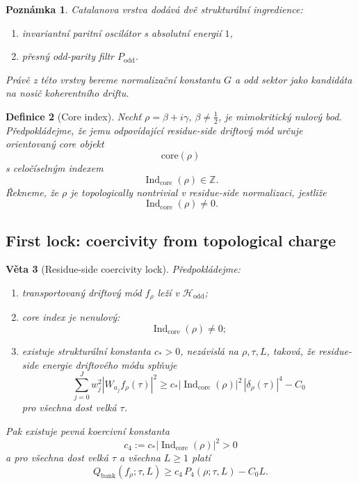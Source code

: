 \documentclass[11pt,a4paper]{article}
\newtheorem{theorem}{Věta}[section]
\newtheorem{definition}[theorem]{Definice}
\newtheorem{remark}[theorem]{Poznámka}
\begin{document}
\begin{remark}
Catalanova vrstva dodává dvě strukturální ingredience:
\begin{enumerate}[label=\textbf{(\arabic*)}]
    \item invariantní paritní oscilátor s absolutní energií \(1\),
    \item přesný odd-parity filtr \(P_{\mathrm{odd}}\).
\end{enumerate}
Právě z této vrstvy bereme normalizační konstantu \(G\) a odd sektor jako kandidáta
na nosič koherentního driftu.
\end{remark}

\begin{definition}[Core index]
Nechť \(\rho=\beta+i\gamma\), \(\beta\neq \frac12\), je mimokritický nulový bod.
Předpokládejme, že jemu odpovídající residue-side driftový mód určuje orientovaný core objekt
\[
\mathrm{core}(\rho)
\]
s celočíselným indexem
\[
\operatorname{Ind}_{\mathrm{core}}(\rho)\in \mathbb Z.
\]
Řekneme, že \(\rho\) je \emph{topologically nontrivial} v residue-side normalizaci, jestliže
\[
\operatorname{Ind}_{\mathrm{core}}(\rho)\neq 0.
\]
\end{definition}

\subsection*{First lock: coercivity from topological charge}

\begin{theorem}[Residue-side coercivity lock]
Předpokládejme:
\begin{enumerate}[label=\textbf{(\arabic*)}]
    \item transportovaný driftový mód \(f_\rho\) leží v \(\mathcal H_{\mathrm{odd}}\);
    \item core index je nenulový:
    \[
    \operatorname{Ind}_{\mathrm{core}}(\rho)\neq 0;
    \]
    \item existuje strukturální konstanta \(c_*>0\), nezávislá na \(\rho,\tau,L\), taková, že
    residue-side energie driftového módu splňuje
    \[
    \sum_{j=0}^{J}w_j^2|W_{a_j}f_\rho(\tau)|^2
    \ge
    c_*|\operatorname{Ind}_{\mathrm{core}}(\rho)|^2\,|\delta_\rho(\tau)|^4-C_0
    \]
    pro všechna dost velká \(\tau\).
\end{enumerate}
Pak existuje pevná koercivní konstanta
\[
c_4:=c_*|\operatorname{Ind}_{\mathrm{core}}(\rho)|^2>0
\]
a pro všechna dost velká \(\tau\) a všechna \(L\ge 1\) platí
\[
Q_{\mathrm{bank}}(f_\rho;\tau,L)
\ge
c_4\,P_4(\rho;\tau,L)-C_0L.
\]
\end{theorem}
\end{document}
